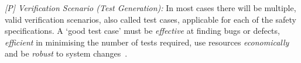 \documentclass[runningheads]{llncs}
\begin{document}
\emph{[P] Verification Scenario (Test Generation):} In most cases there will be multiple, valid verification scenarios, also called test cases, applicable for each of the safety specifications. A `good test case' must be \emph{effective} at finding bugs or defects, \emph{efficient} in minimising the number of tests required, use resources \emph{economically} and be \emph{robust} to system changes~\cite{Fewster1999}. 



\end{document}
